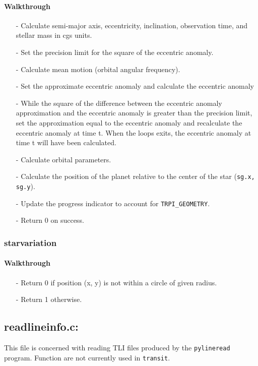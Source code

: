 \documentclass[letterpaper,12pt]{article}
\begin{document}
\paragraph{Walkthrough}
\begin{enumerate}[leftmargin=10pt, noitemsep, parsep=0pt, topsep=0ex]
\item[-] Calculate semi-major axis, eccentricity, inclination, observation time, and stellar mass in cgs units.
\item[-] Set the precision limit for the square of the eccentric anomaly.
\item[-] Calculate mean motion (orbital angular frequency).
\item[-] Set the approximate eccentric anomaly and calculate the eccentric anomaly
\item[-] While the square of the difference between the eccentric anomaly approximation and the eccentric anomaly is greater than the precision limit, set the approximation equal to the eccentric anomaly and recalculate the eccentric anomaly at time t. When the loops exits, the eccentric anomaly at time t will have been calculated.
\item[-] Calculate orbital parameters.
\item[-] Calculate the position of the planet relative to the center of the star ({\tt sg.x, sg.y}).
\item[-] Update the progress indicator to account for {\tt TRPI\_GEOMETRY}.
\item[-] Return 0 on success.
\end{enumerate}

\subsubsection{starvariation}
\paragraph{Walkthrough}
\begin{enumerate}[leftmargin=10pt, noitemsep, parsep=0pt, topsep=0ex]
\item[-] Return 0 if position (x, y) is not within a circle of given radius.
\item[-] Return 1 otherwise.
\end{enumerate}

\newpage
\subsection{readlineinfo.c:}
This file is concerned with reading TLI files produced by the {\tt pylineread} program. Function  are not currently used in {\tt transit}.
\end{document}
